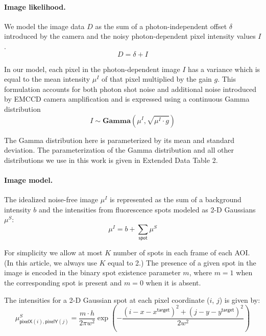 \paragraph{Image likelihood.} We model the image data $D$ as the sum of a photon-independent offset $\delta$ introduced by the camera and the noisy photon-dependent pixel intensity values $I$.
%
\begin{equation}
    D = \delta + I
\end{equation}

In our model, each pixel in the photon-dependent image $I$ has a  variance which is equal to  the mean intensity $\mu^I$ of that pixel multiplied by the gain $g$. This formulation accounts for both photon shot noise and additional noise introduced by EMCCD camera amplification \cite{Van_Vliet1998-jk} and is expressed using a continuous Gamma distribution
%
\begin{equation}
    I \sim \mathbf{Gamma} (\mu^I, \sqrt{\mu^I \cdot g})
\end{equation}

The Gamma distribution here is parameterized by its mean and standard deviation. The parameterization of the Gamma distribution and all other distributions we use in this work is given in Extended Data Table 2.

\paragraph{Image model.} The idealized noise-free image $\mu^I$ is represented  as the sum of a background intensity $b$ and the intensities from fluorescence spots modeled as  2-D Gaussians $\mu^S$:
%
\begin{equation}
    \mu^I = b + \sum_{\mathsf{spot}} \mu^S
\end{equation}

\noindent
For simplicity we allow at most $K$ number of spots in each frame of each AOI.  (In this article, we always use $K$ equal to 2.)  The presence of a given spot in the image is encoded in the binary spot existence parameter $m$, where $m = 1$ when the corresponding spot is present and $m = 0$ when it is absent.

The intensities for a 2-D Gaussian spot at each pixel coordinate ($i$, $j$) is given by:
%
\begin{equation}
    \mu^S_{\mathsf{pixelX}(i), \mathsf{pixelY}(j)} = \dfrac{m \cdot h}{2 \pi w^2} \exp{\left( -\dfrac{(i-x-x^\mathsf{target})^2 + (j-y-y^\mathsf{target})^2}{2 w^2} \right)}
\end{equation}

